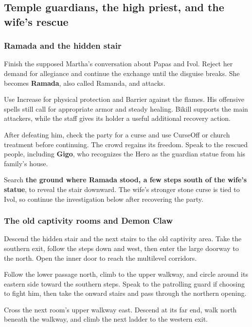 \subsection{Temple guardians, the high priest, and the wife's rescue}

\subsubsection*{Ramada and the hidden stair}

Finish the supposed Martha's conversation about Papas and
Ivol. Reject her demand for allegiance and continue the
exchange until the disguise breaks. She becomes
\textbf{Ramada}, also called Ramanda, and attacks.

Use Increase for physical protection and Barrier against
the flames. His offensive spells still call for appropriate
armor and steady healing. Bikill supports the main attackers,
while the staff gives its holder a useful additional recovery
action.

After defeating him, check the party for a curse and use
CurseOff or church treatment before continuing. The crowd
regains its freedom. Speak to the rescued people, including
\textbf{Gigo}, who recognizes the Hero as the guardian
statue from his family's house.

Search \textbf{the ground where Ramada stood, a few steps
south of the wife's statue}, to reveal the stair downward.
The wife's stronger stone curse is tied to Ivol, so continue
the investigation below after recovering the party.

\subsubsection*{The old captivity rooms and Demon Claw}

Descend the hidden stair and the next stairs to the old
captivity area. Take the southern exit, follow the steps
down and west, then enter the large doorway to the north.
Open the inner door to reach the multilevel corridors.

Follow the lower passage north, climb to the upper walkway,
and circle around its eastern side toward the southern
steps. Speak to the patrolling guard if choosing to fight
him, then take the onward stairs and pass through the
northern opening.

Cross the next room's upper walkway east. Descend at its
far end, walk north beneath the walkway, and climb the
next ladder to the western exit.

